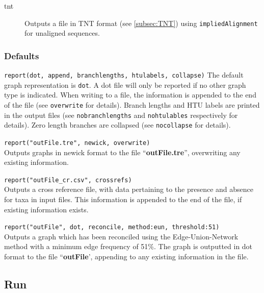 \begin{description}
		\item[tnt] Outputs a file in TNT \citep{Goloboffetal2008} format (see 
		\ref{subsec:TNT}) using \texttt{impliedAlignment} for unaligned sequences.
				 
	\end{description}			
		
	\subsubsection{Defaults}
		\texttt{report(dot, append, branchlengths, htulabels, collapse)}
		The default graph representation is \texttt{dot}. A dot file will only be 
		reported if no other graph type is indicated. When writing to a file, the 
		information is appended to the end of the file (see \texttt{overwrite} for 
		details). Branch lengths and HTU labels are printed in the output files 
		(see \texttt{nobranchlengths} and \texttt{nohtulables} respectively
		for details). Zero length branches are collapsed (see \texttt{nocollapse}
		for details). 
		
		
	\begin{example}
		\item{\texttt{report("outFile.tre", newick, overwrite)}\\ Outputs graphs in newick format to 
		the file ``\textbf{outFile.tre}'', overwriting any existing information.}
		
		\item{\texttt{report("outFile\_cr.csv", crossrefs)}\\ Outputs a cross reference file, with
		data pertaining to the presence and absence for taxa in input files. This information
		is appended to the end of the file, if existing information exists.}
		
		\item{\texttt{report("outFile", dot, reconcile, method:eun, threshold:51)}\\ Outputs a
		graph which has been reconciled using the Edge-Union-Network method with a 
		minimum edge frequency of 51\%. The graph is outputted in dot format to the 
		file ``\textbf{outFile}', appending to any existing information in the file.}
	\end{example}

\subsection{Run}
